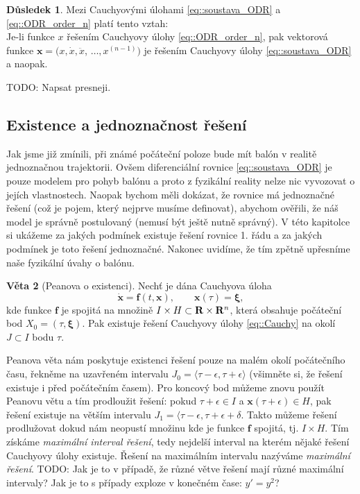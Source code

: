 \documentclass[a4paper, 12pt]{book}
\theoremstyle{definition}
\newtheorem{theorem}{Věta}[section]
\newtheorem{corollary}[theorem]{Důsledek}
\def\Real{{\rm\bf R}}
\def\vc#1{\mathbf{\boldsymbol{#1}}}     %
\def\df#1{\emph{#1}}
\def\todo#1{{\color{green}TODO:} #1}
\begin{document}
\begin{corollary}
\label{thm:ODR_order_n}
Mezi Cauchyovými úlohami \eqref{eq::soustava_ODR} a \eqref{eq::ODR_order_n} platí tento vztah:\\
Je-li funkce $x$ řešením Cauchyovy úlohy \eqref{eq::ODR_order_n}, pak vektorová funkce
$\vc x=(x,\dot x, \ddot x$, $\dots,x^{(n-1)})$ je řešením Cauchyovy úlohy 
\eqref{eq::soustava_ODR} a naopak.
\end{corollary}
\todo{Napsat presneji.}








\subsection{Existence a jednoznačnost řešení}
Jak jsme již zmínili, při známé počáteční poloze bude mít balón v realitě jednoznačnou trajektorii. 
Ovšem diferenciální rovnice \eqref{eq::soustava_ODR} je pouze modelem pro pohyb balónu a proto 
z fyzikální reality nelze nic vyvozovat o jejích vlastnostech. Naopak bychom měli dokázat, že rovnice má 
jednoznačné řešení (což je pojem, který nejprve musíme definovat), abychom ověřili, že náš model je správně postulovaný 
(nemusí být ještě nutně správný). V této kapitolce si ukážeme za jakých podmínek existuje řešení rovnice 1. řádu a
za jakých podmínek je toto řešení jednoznačné. Nakonec uvidíme, že tím zpětně upřesníme naše fyzikální úvahy o balónu.



\begin{theorem}[Peanova o existenci]
\label{thm::Peano}
Nechť je dána Cauchyova úloha
\begin{equation}
  \label{eq::Cauchy}
  \dot{\vc x}=\vc f(t,\vc x),\qquad\vc x(\tau)=\vc \xi,
\end{equation}
kde funkce $\vc f$ je spojitá na množině $I \times H \subset \Real \times \Real^n$, která obsahuje počáteční bod $X_0=( \tau, \vc \xi)$.
Pak existuje řešení Cauchyovy úlohy \eqref{eq::Cauchy} na okolí $J \subset I$ bodu $\tau$.
\end{theorem}

Peanova věta nám poskytuje existenci řešení pouze na malém okolí počátečního času, řekněme na uzavřeném intervalu $J_0=\langle \tau-\epsilon, \tau + \epsilon \rangle$ 
(všimněte si, že řešení existuje i před počátečním časem). Pro koncový bod můžeme znovu použít Peanovu větu a tím prodloužit řešení: pokud $\tau + \epsilon \in I$
a $\vc x(\tau + \epsilon) \in H$, pak řešení existuje na větším intervalu $J_1 = \langle \tau - \epsilon, \tau + \epsilon + \delta$. Takto můžeme řešení prodlužovat dokud nám neopustí množinu
kde je funkce $\vc f$ spojitá, tj. $I \times H$. Tím získáme \df{maximální interval řešení}, tedy nejdelší interval na kterém nějaké řešení Cauchyovy úlohy existuje. Řešení na maximálním intervalu
nazýváme \df{maximální řešení}. \todo{Jak je to v případě, že různé větve řešení mají různé maximální intervaly? Jak je to s případy exploze v konečném čase: $y'=y^2$?}
\end{document}
